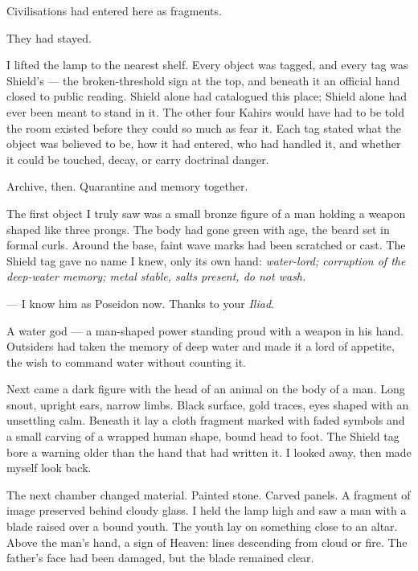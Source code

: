 Civilisations had entered here as fragments.\par

They had stayed.\par

I lifted the lamp to the nearest shelf. Every object was tagged, and every tag was Shield's --- the broken-threshold sign at the top, and beneath it an official hand closed to public reading. Shield alone had catalogued this place; Shield alone had ever been meant to stand in it. The other four Kahirs would have had to be told the room existed before they could so much as fear it. Each tag stated what the object was believed to be, how it had entered, who had handled it, and whether it could be touched, decay, or carry doctrinal danger.\par

Archive, then. Quarantine and memory together.\par

The first object I truly saw was a small bronze figure of a man holding a weapon shaped like three prongs. The body had gone green with age, the beard set in formal curls. Around the base, faint wave marks had been scratched or cast. The Shield tag gave no name I knew, only its own hand: \textit{water-lord; corruption of the deep-water memory; metal stable, salts present, do not wash.}\par

\begin{room}

--- I know him as Poseidon now. Thanks to your \textit{Iliad}.

\end{room}

A water god --- a man-shaped power standing proud with a weapon in his hand. Outsiders had taken the memory of deep water and made it a lord of appetite, the wish to command water without counting it.\par

Next came a dark figure with the head of an animal on the body of a man. Long snout, upright ears, narrow limbs. Black surface, gold traces, eyes shaped with an unsettling calm. Beneath it lay a cloth fragment marked with faded symbols and a small carving of a wrapped human shape, bound head to foot. The Shield tag bore a warning older than the hand that had written it. I looked away, then made myself look back.\par

The next chamber changed material. Painted stone. Carved panels. A fragment of image preserved behind cloudy glass. I held the lamp high and saw a man with a blade raised over a bound youth. The youth lay on something close to an altar. Above the man's hand, a sign of Heaven: lines descending from cloud or fire. The father's face had been damaged, but the blade remained clear.\par

